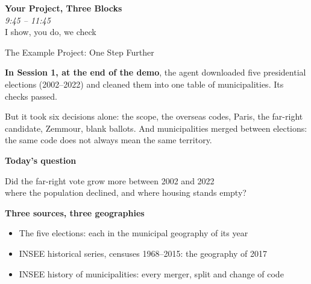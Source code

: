\documentclass[svgnames,x11names,dvipsnames]{beamer}
\newcommand{\chg}[1]{{\bfseries #1}}
\renewcommand{\chg}[1]{#1}
\begin{document}
\begin{frame}[plain]
  \centering
  \vfill
  {\LARGE \textbf{\textcolor{titleblue}{Your Project, Three Blocks}}}\\[0.4cm]
  {\large \textit{9:45 -- 11:45}}\\[0.3cm]
  {I show, you do, we check}
  \vfill
\end{frame}

\begin{frame}{The Example Project: One Step Further}

\small
\textbf{In Session 1, at the end of the demo}, the agent downloaded five presidential elections (2002--2022) and cleaned them into one table of municipalities. Its checks passed.

\vspace{0.2cm}

But it took six decisions alone: the scope, the overseas codes, Paris, the far-right candidate, Zemmour, blank ballots. And municipalities merged between elections: the same code does not always mean the same territory.

\vspace{0.35cm}

\textbf{Today's question}

\vspace{0.1cm}
\centering
Did the far-right vote grow more between 2002 and 2022\\ where the population declined\chg{, and where housing stands empty}?

\vspace{0.35cm}
\raggedright
\textbf{Three sources, three geographies}
\begin{itemize}
    \setlength{\itemsep}{1pt}
    \item The five elections: each in the municipal geography of its year
    \item INSEE historical series, censuses 1968--2015: the geography of 2017
    \item INSEE history of municipalities: every merger, split and change of code
\end{itemize}

\end{frame}
\end{document}
